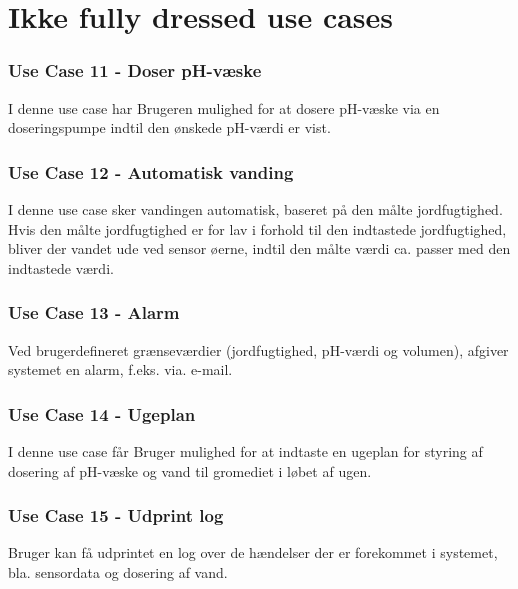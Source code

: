\section{Ikke fully dressed use cases}

\subsubsection*{Use Case 11 - Doser pH-væske}
I denne use case har Brugeren mulighed for at dosere pH-væske via en doseringspumpe indtil den ønskede pH-værdi er vist. 

\subsubsection*{Use Case 12 - Automatisk vanding}
I denne use case sker vandingen automatisk, baseret på den målte jordfugtighed. Hvis den målte jordfugtighed er for lav i forhold til den indtastede jordfugtighed, bliver der vandet ude ved sensor øerne, indtil den målte værdi ca. passer med den indtastede værdi.

\subsubsection*{Use Case 13 - Alarm}
Ved brugerdefineret grænseværdier (jordfugtighed, pH-værdi og volumen), afgiver systemet en alarm, f.eks. via. e-mail. 

\subsubsection*{Use Case 14 - Ugeplan}
I denne use case får Bruger mulighed for at indtaste en ugeplan for styring af dosering af pH-væske og vand til gromediet i løbet af ugen. 

\subsubsection*{Use Case 15 - Udprint log}
Bruger kan få udprintet en log over de hændelser der er forekommet i systemet, bla. sensordata og dosering af vand.